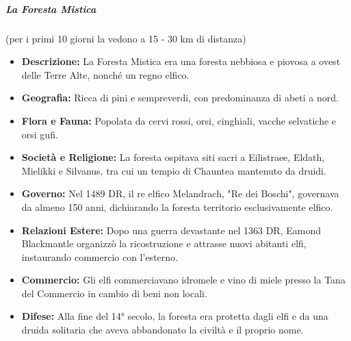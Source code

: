 \documentclass{article}
\begin{document}
                \subparagraph{La Foresta Mistica} (per i primi 10 giorni la vedono a 15 - 30 km di distanza)
                \begin{itemize}
                    \item \textbf{Descrizione:} La Foresta Mistica era una foresta nebbiosa e piovosa a ovest delle Terre Alte, nonché un regno elfico.
                    
                    \item \textbf{Geografia:} Ricca di pini e sempreverdi, con predominanza di abeti a nord.
                    
                    \item \textbf{Flora e Fauna:} Popolata da cervi rossi, orsi, cinghiali, vacche selvatiche e orsi gufi.
                    
                    \item \textbf{Società e Religione:} La foresta ospitava siti sacri a Eilistraee, Eldath, Mielikki e Silvanus, tra cui un tempio di Chauntea mantenuto da druidi.
                    
                    \item \textbf{Governo:} Nel 1489 DR, il re elfico Melandrach, "Re dei Boschi", governava da almeno 150 anni, dichiarando la foresta territorio esclusivamente elfico.
                    
                    \item \textbf{Relazioni Estere:} Dopo una guerra devastante nel 1363 DR, Eamond Blackmantle organizzò la ricostruzione e attrasse nuovi abitanti elfi, instaurando commercio con l'esterno.
                    
                    \item \textbf{Commercio:} Gli elfi commerciavano idromele e vino di miele presso la Tana del Commercio in cambio di beni non locali.
                    
                    \item \textbf{Difese:} Alla fine del 14° secolo, la foresta era protetta dagli elfi e da una druida solitaria che aveva abbandonato la civiltà e il proprio nome.
                \end{itemize}     
            
        
\end{document}
